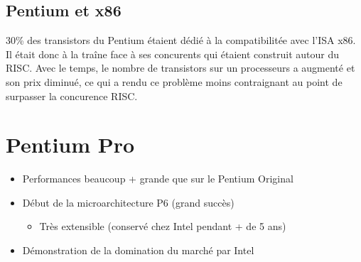 \documentclass[a4paper]{article}
\begin{document}
    \subsection{Pentium et x86}
    30\% des transistors du Pentium étaient dédié à la compatibilitée avec l'ISA x86. Il était donc à la traîne face à ses concurents qui étaient construit autour du RISC. Avec le temps,
    le nombre de transistors sur un processeurs a augmenté et son prix diminué, ce qui a rendu ce problème moins contraignant au point de surpasser la concurence RISC.





















  \section{Pentium Pro}
  \begin{itemize}
    \item Performances beaucoup + grande que sur le Pentium Original
    \item Début de la microarchitecture P6 (grand succès)
    \begin{itemize}
      \item Très extensible (conservé chez Intel pendant + de 5 ans)
    \end{itemize}
    \item Démonstration de la domination du marché par Intel
  \end{itemize}
\end{document}
